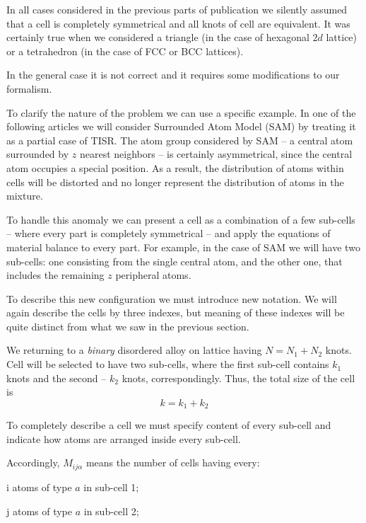\documentclass[12pt,abstract]{scrartcl}
\begin{document}
In all cases considered  in the previous parts of publication we silently assumed that a cell is completely symmetrical and all knots of cell are equivalent. 
It was certainly true when we considered  a triangle (in the case of hexagonal $2d$ lattice) or a tetrahedron (in the case of FCC or BCC lattices).

In the general case it is not correct and it requires some modifications to our formalism. 

To clarify the nature of the problem we  can use  a specific example. 
In one of the following articles we will consider Surrounded Atom Model (SAM) \cite{Mathieu_1965, Hicter1967} by treating it as a partial case of TISR. 
The atom group considered by SAM -- a central atom surrounded by $z$ nearest  neighbors -- is certainly asymmetrical, since the central atom occupies a special position.
As a result, the distribution of atoms within cells will be distorted and no longer represent the distribution of atoms in the mixture.



To handle this anomaly we can present a cell as a combination of a few sub-cells -- where  every part is completely symmetrical --  and apply the equations of material balance to every part. 
For example, in the case of SAM we will have two sub-cells: one consisting from the single central atom, and the other one, that includes the remaining $z$ peripheral atoms.

To describe this new configuration we must introduce new notation. 
We will again describe  the cells by three indexes, but meaning of these indexes will be quite distinct from what we saw in the previous section.


We returning to a \textit{binary} disordered alloy on lattice having $N = N_1 + N_2$ knots.
Cell will be selected to have two sub-cells,  where the first sub-cell contains $k_1$ knots and the second -- $k_2$ knots, correspondingly. 
Thus, the total size of the cell is
\begin{equation} \label{k}
    k = k_1 + k_2
\end{equation}

To completely describe a cell we must specify content of every sub-cell and indicate how atoms are arranged inside every sub-cell.

Accordingly, $M_{i j \alpha}$ means the number of cells having every:

i atoms of type $a$ in  sub-cell 1;

j atoms of type $a$ in  sub-cell 2;
\end{document}
